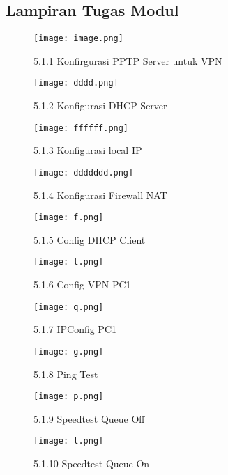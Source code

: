 \subsection{Lampiran Tugas Modul}
\begin{figure}
    \centering
    \texttt{[image: image.png]}
    \caption{5.1.1 Konfirgurasi PPTP Server untuk VPN}
    \label{fig:enter-label}
\end{figure}
\begin{figure}
    \centering
    \texttt{[image: dddd.png]}
    \caption{5.1.2 Konfigurasi DHCP Server}
    \label{fig:enter-label}
\end{figure}
\begin{figure}
    \centering
    \texttt{[image: ffffff.png]}
    \caption{5.1.3 Konfigurasi local IP}
    \label{fig:enter-label}
\end{figure}
\begin{figure}
    \centering
    \texttt{[image: ddddddd.png]}
    \caption{5.1.4 Konfigurasi Firewall NAT}
    \label{fig:enter-label}
\end{figure}
\begin{figure}
    \centering
    \texttt{[image: f.png]}
    \caption{5.1.5 Config DHCP Client}
    \label{fig:enter-label}
\end{figure}
\begin{figure}
    \centering
    \texttt{[image: t.png]}
    \caption{5.1.6 Config VPN PC1}
    \label{fig:enter-label}
\end{figure}
\begin{figure}
    \centering
    \texttt{[image: q.png]}
    \caption{5.1.7 IPConfig PC1}
    \label{fig:enter-label}
\end{figure}
\begin{figure}
    \centering
    \texttt{[image: g.png]}
    \caption{5.1.8 Ping Test}
    \label{fig:enter-label}
\end{figure}
\begin{figure}
    \centering
    \texttt{[image: p.png]}
    \caption{5.1.9 Speedtest Queue Off}
    \label{fig:enter-label}
\end{figure}
\begin{figure}
    \centering
    \texttt{[image: l.png]}
    \caption{5.1.10 Speedtest Queue On}
    \label{fig:enter-label}
\end{figure}
